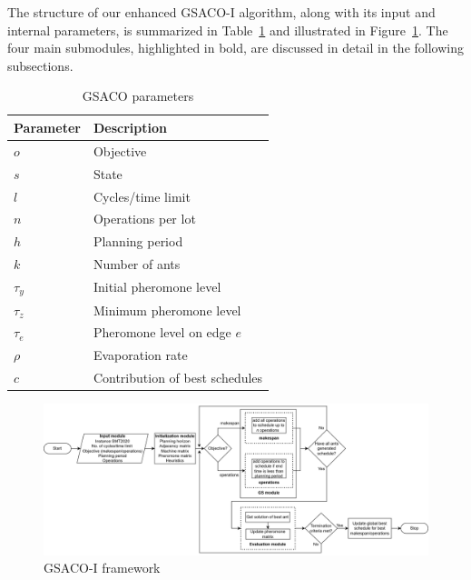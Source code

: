 The structure of our enhanced GSACO-I algorithm, along with its input and internal parameters, 
is summarized in Table~\ref{tab:parameters} and 
illustrated in Figure~\ref{fig:aco-flowchart}. 
The four main submodules, highlighted in bold, are discussed in detail in the following subsections.

\begin{table}[t]
	\caption{GSACO parameters}\label{tab:parameters} \centering
	\begin{tabular}{|l|l|}
		\hline
		Parameter & Description \\ \hline
		$o$ & Objective \\
		$s$ & State \\
		$l$ & Cycles/time limit        \\
		$n$ & Operations per lot \\
		$h$ & Planning period \\
		$k$ & Number of ants \\
		$\tau_{y}$ & Initial pheromone level \\
		$\tau_{z}$ & Minimum pheromone level \\
		$\tau_{e}$ & Pheromone level on edge $e$ \\
		$\rho$ & Evaporation rate \\
		$c$ & Contribution of best schedules \\
		\hline
	\end{tabular}
\end{table}

\begin{figure}[t]
	\includegraphics[width=\textwidth]{aco-flowchart.png}
	\caption{GSACO-I framework}
	\label{fig:aco-flowchart}
\end{figure}

